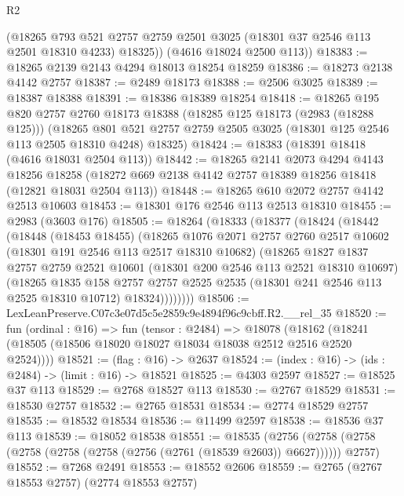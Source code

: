 \begin{lexlean}{R2}
\begin{coremodule}
        (@18265
          @793
          @521
          @2757
          @2759
          @2501
          @3025
          (@18301 @37 @2546 @113 @2501 @18310 @4233)
          @18325))
      (@4616 @18024 @2500 @113))
@18383 := @18265 @2139 @2143 @4294 @18013 @18254 @18259
@18386 := @18273 @2138 @4142 @2757
@18387 := @2489 @18173
@18388 := @2506 @3025
@18389 := @18387 @18388
@18391 := @18386 @18389 @18254
@18418 := @18265
    @195
    @820
    @2757
    @2760
    @18173
    @18388
    (@18285 @125 @18173 (@2983 (@18288 @125)))
    (@18265 @801 @521 @2757 @2759 @2505 @3025 (@18301 @125 @2546 @113 @2505 @18310 @4248) @18325)
@18424 := @18383 (@18391 @18418 (@4616 @18031 @2504 @113))
@18442 := @18265
    @2141
    @2073
    @4294
    @4143
    @18256
    @18258
    (@18272 @669 @2138 @4142 @2757 @18389 @18256 @18418 (@12821 @18031 @2504 @113))
@18448 := @18265 @610 @2072 @2757 @4142 @2513 @10603
@18453 := @18301 @176 @2546 @113 @2513 @18310
@18455 := @2983 (@3603 @176)
@18505 := @18264
    (@18333
      (@18377
        (@18424
          (@18442
            (@18448
              (@18453 @18455)
              (@18265
                @1076
                @2071
                @2757
                @2760
                @2517
                @10602
                (@18301 @191 @2546 @113 @2517 @18310 @10682)
                (@18265
                  @1827
                  @1837
                  @2757
                  @2759
                  @2521
                  @10601
                  (@18301 @200 @2546 @113 @2521 @18310 @10697)
                  (@18265
                    @1835
                    @158
                    @2757
                    @2757
                    @2525
                    @2535
                    (@18301 @241 @2546 @113 @2525 @18310 @10712)
                    @18324))))))))
@18506 := LexLeanPreserve.C07c3e07d5c5e2859c9e4894f96c9cbff.R2.__rel_35
@18520 := fun (ordinal : @16) =>
  fun (tensor : @2484) =>
  @18078 (@18162 (@18241 (@18505 (@18506 @18020 @18027 @18034 @18038 @2512 @2516 @2520 @2524))))
@18521 := (flag : @16) -> @2637
@18524 := (index : @16) -> (ids : @2484) -> (limit : @16) -> @18521
@18525 := @4303 @2597
@18527 := @18525 @37 @113
@18529 := @2768 @18527 @113
@18530 := @2767 @18529
@18531 := @18530 @2757
@18532 := @2765 @18531
@18534 := @2774 @18529 @2757
@18535 := @18532 @18534
@18536 := @11499 @2597
@18538 := @18536 @37 @113
@18539 := @18052 @18538
@18551 := @18535
    (@2756 (@2758 (@2758 (@2758 (@2758 (@2758 (@2756 (@2761 (@18539 @2603)) @6627)))))) @2757)
@18552 := @7268 @2491
@18553 := @18552 @2606
@18559 := @2765 (@2767 @18553 @2757) (@2774 @18553 @2757)

\end{coremodule}
\end{lexlean}
